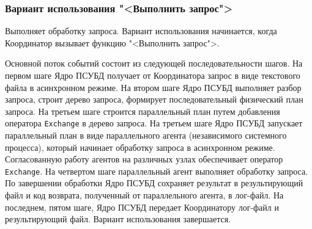 \documentclass[11pt,oneside]{article}
\begin{document}
	\subsubsection{Вариант использования "<Выполнить запрос">}
	\par Выполняет обработку запроса. Вариант использования начинается, когда Координатор вызывает функцию "<Выполнить запрос">.
	\par Основной поток событий состоит из следующей последовательности шагов. На первом шаге Ядро ПСУБД получает от Координатора запрос в виде текстового файла в асинхронном режиме. На втором шаге Ядро ПСУБД выполняет разбор запроса, строит дерево запроса, формирует последовательный физический план запроса. На третьем шаге строится параллельный план путем добавления оператора \texttt{Exchange} в дерево запроса. На третьем шаге Ядро ПСУБД запускает параллельный план в виде параллельного агента (независимого системного процесса), который начинает обработку запроса в асинхронном режиме. Согласованную работу агентов на различных узлах обеспечивает оператор \texttt{Exchange}. На четвертом шаге параллельный агент выполняет обработку запроса. По завершении обработки Ядро ПСУБД сохраняет результат в результирующий файл и код возврата, полученный от параллельного агента, в лог-файл.
	На последнем, пятом шаге, Ядро ПСУБД передает Координатору лог-файл и результирующий файл. Вариант использования завершается.
	
\end{document}
